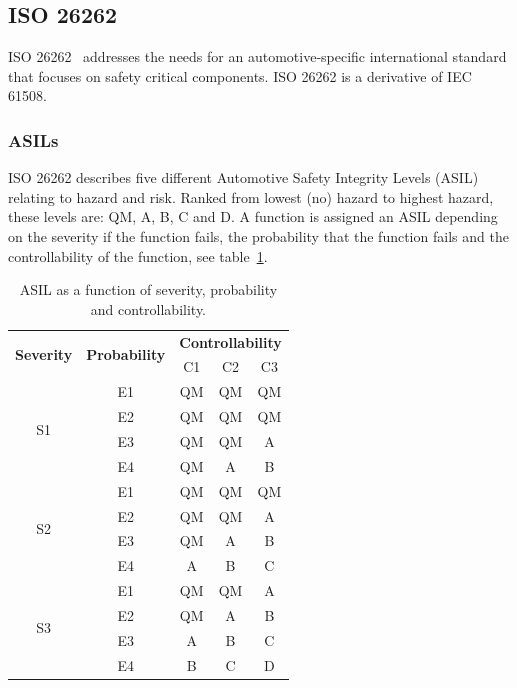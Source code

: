 \subsection{ISO 26262}
ISO 26262~\cite{ISO26262} addresses the needs for an automotive-specific international standard that focuses on safety critical components. ISO 26262 is a derivative of IEC 61508.

\subsubsection{ASILs}
ISO 26262 describes five different Automotive Safety Integrity Levels (ASIL) relating to hazard and risk. Ranked from lowest (no) hazard to highest hazard, these levels are: QM, A, B, C and D. A function is assigned an ASIL depending on the severity if the function fails, the probability that the function fails and the controllability of the function, see table~\ref{table:ASIL}.

\begin{table}[H]
\centering
\begin{tabular}{|c|c|c|c|c|}
\hline
\multirow{2}{*}{\textbf{Severity}} &\multirow{2}{*}{\textbf{Probability}} &\multicolumn{3}{|c|}{\textbf{Controllability}} \\ \cline{3-5}
 & &C1 &C2 &C3 \\ \hline
\multirow{4}{*}{S1} & E1 & QM & QM & QM \\ \cline{2-5}
 & E2 & QM & QM & QM \\ \cline{2-5}
 & E3 & QM & QM & A \\ \cline{2-5}
 & E4 & QM & A & B \\ \hline
\multirow{4}{*}{S2} & E1 & QM & QM & QM \\ \cline{2-5}
 & E2 & QM & QM & A \\ \cline{2-5}
 & E3 & QM & A & B \\ \cline{2-5}
 & E4 & A & B & C \\ \hline
\multirow{4}{*}{S3} & E1 & QM & QM & A \\ \cline{2-5}
 & E2 & QM & A & B \\ \cline{2-5}
 & E3 & A & B & C \\ \cline{2-5}
 & E4 & B & C & D \\ \hline
\end{tabular}
\caption{ASIL as a function of severity, probability and controllability.}
\label{table:ASIL}
\end{table}

